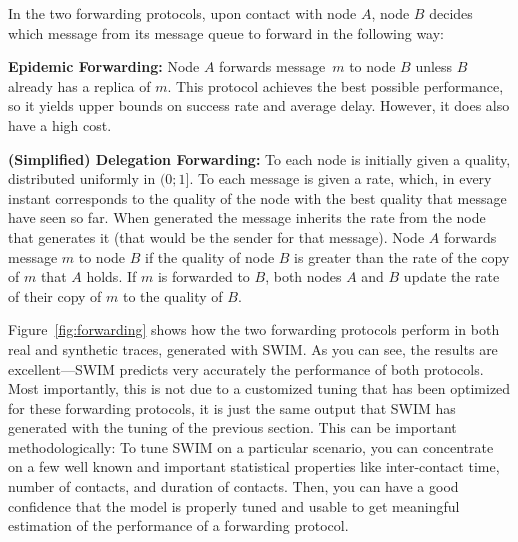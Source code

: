 \documentclass[conference]{IEEEtran}
\begin{document}
In the two forwarding protocols, upon contact with node $A$, node $B$ decides
which message from its message queue to forward in the following way:
\begin{trivlist}
\item
\textbf{Epidemic Forwarding:} Node $A$ forwards message~$m$ to node $B$ unless
$B$ already has a replica of $m$. This protocol achieves the best possible
performance, so it yields upper bounds on success rate and average delay.
However, it does also have a high cost.
\item
\textbf{(Simplified) Delegation Forwarding:} To each node is initially given a
quality, distributed uniformly in $(0;1]$. To each message is given a rate,
which, in every instant corresponds to the quality of the node with the best
quality that message have seen so far. When generated the message inherits the
rate from the node that generates it (that would be the sender for that
message). Node $A$ forwards message $m$ to node $B$ if the quality of node $B$
is greater than the rate of the copy of $m$ that $A$ holds. If $m$ is forwarded
to $B$, both nodes $A$ and $B$ update the rate of their copy of $m$ to the
quality of $B$.
\end{trivlist}

Figure~\ref{fig:forwarding} shows how the two forwarding protocols perform in
both real and synthetic traces, generated with SWIM.
As you can see, the results are excellent---SWIM predicts very accurately the
performance of both protocols. Most importantly, this is not due to a customized
tuning that has been optimized for these forwarding protocols, it is just the
same output that SWIM has generated with the tuning of the previous section.
This can be important methodologically: To tune SWIM on a particular scenario,
you can concentrate on a few well known and important statistical properties
like inter-contact time, number of contacts, and duration of contacts. Then, you
can have a good confidence that the model is properly tuned and usable to get
meaningful estimation of the performance of a forwarding protocol.
\end{document}
